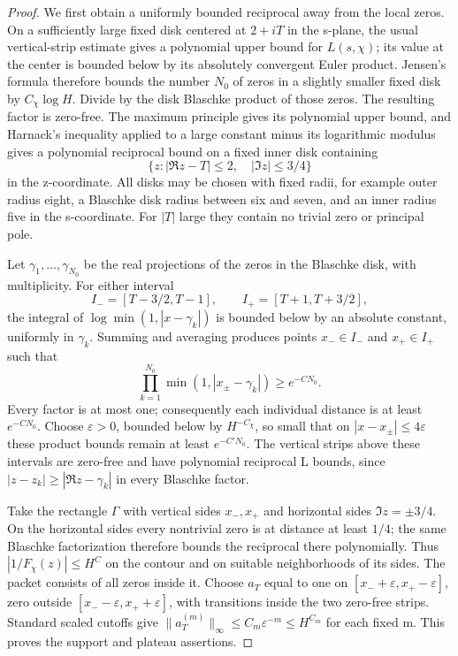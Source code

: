 \begin{proof}
We first obtain a uniformly bounded reciprocal away from the local
zeros.  On a sufficiently large fixed disk centered at $2+iT$ in
the s-plane, the usual vertical-strip estimate gives a polynomial
upper bound for $L(s,\chi)$; its value at the center is bounded
below by its absolutely convergent Euler product.  Jensen's formula
therefore bounds the number $N_0$ of zeros in a slightly smaller
fixed disk by $C_\chi\log H$.
Divide by the disk Blaschke product of those zeros.  The resulting
factor is zero-free.  The maximum principle gives its polynomial
upper bound, and Harnack's inequality applied to a large constant
minus its logarithmic modulus gives a polynomial reciprocal bound
on a fixed inner disk containing
\[
 \{z:|\Re z-T|\leq2,\quad |\Im z|\leq3/4\}
\]
in the z-coordinate.  All disks may be chosen with fixed radii,
for example outer radius eight, a Blaschke disk radius between six
and seven, and an inner radius five in the s-coordinate.
For $|T|$ large they contain no trivial zero or principal pole.

Let $\gamma_1,\ldots,\gamma_{N_0}$ be the real projections of the
zeros in the Blaschke disk, with multiplicity.  For either interval
\[
 I_-=[T-3/2,T-1],\qquad I_+=[T+1,T+3/2],
\]
the integral of $\log\min(1,|x-\gamma_k|)$ is bounded below by an
absolute constant, uniformly in $\gamma_k$.
Summing and averaging produces points $x_-\in I_-$ and
$x_+\in I_+$ such that
\[
 \prod_{k=1}^{N_0}\min(1,|x_\pm-\gamma_k|)\geq e^{-C N_0}.
\]
Every factor is at most one; consequently each individual distance
is at least $e^{-CN_0}$.  Choose $\varepsilon>0$, bounded below by
$H^{-C_\chi}$, so small that on
$|x-x_\pm|\leq4\varepsilon$ these product bounds remain at least
$e^{-C' N_0}$.  The vertical strips above these intervals are
zero-free and have polynomial reciprocal L bounds, since
$|z-z_k|\geq|\Re z-\gamma_k|$ in every Blaschke factor.

Take the rectangle $\Gamma$ with vertical sides $x_-,x_+$ and
horizontal sides $\Im z=\pm3/4$.  On the horizontal sides every
nontrivial zero is at distance at least $1/4$; the same Blaschke
factorization therefore bounds the reciprocal there polynomially.
Thus $|1/F_\chi(z)|\leq H^C$ on the contour and on suitable
neighborhoods of its sides.  The packet consists of all zeros
inside it.  Choose $a_T$ equal to one on
$[x_-+\varepsilon,x_+-\varepsilon]$, zero outside
$[x_--\varepsilon,x_++\varepsilon]$, with transitions inside the
two zero-free strips.  Standard scaled cutoffs give
$\|a_T^{(m)}\|_\infty\leq C_m\varepsilon^{-m}\leq H^{C_m}$
for each fixed m.  This proves the support and plateau assertions.


\end{proof}
